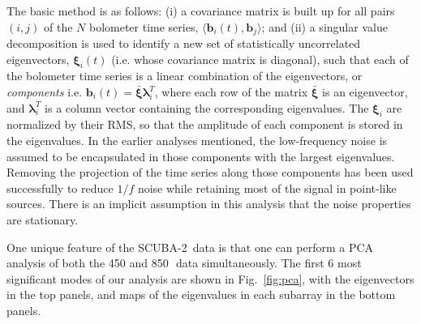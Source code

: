 \documentclass[useAMS,usenatbib,nofootinbib]{mn2e}
\newcommand{\scuba}{SCUBA-2}
\newcommand{\rms}{RMS}
\begin{document}
The basic method is as follows: (i) a covariance matrix is built up
for all pairs $(i,j)$ of the $N$ bolometer time series,
$\langle\mathbf{b}_i(t),\mathbf{b}_j\rangle$; and (ii) a singular
value decomposition is used to identify a new set of statistically
uncorrelated eigenvectors, $\mathbf{\xi}_i(t)$ (i.e. whose covariance
matrix is diagonal), such that each of the bolometer time series is a
linear combination of the eigenvectors, or \emph{components}
i.e. $\mathbf{b}_i(t) = \bar{\mathbf{\xi}} \mathbf{\lambda}_i^T$,
where each row of the matrix $\bar{\mathbf{\xi}}$ is an eigenvector,
and $\mathbf{\lambda}_i^T$ is a column vector containing the
corresponding eigenvalues. The $\mathbf{\xi}_i$ are normalized by
their \rms, so that the amplitude of each component is stored in the
eigenvalues. In the earlier analyses mentioned, the low-frequency
noise is assumed to be encapsulated in those components with the
largest eigenvalues. Removing the projection of the time series along
those components has been used successfully to reduce $1/f$ noise
while retaining most of the signal in point-like sources. There is an
implicit assumption in this analysis that the noise properties are
stationary.

One unique feature of the \scuba\ data is that one can perform a PCA
analysis of both the 450 and 850\,\micron\ data simultaneously. The
first 6 most significant modes of our analysis are shown in
Fig.~\ref{fig:pca}, with the eigenvectors in the top panels, and maps
of the eigenvalues in each subarray in the bottom panels.
\end{document}
